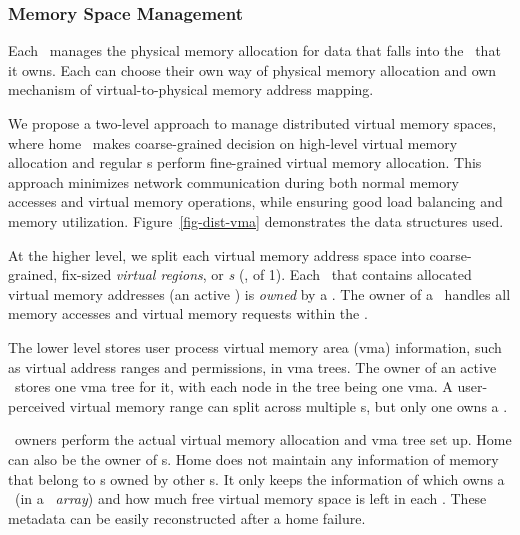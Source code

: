 \documentclass[10pt,times,twocolumn]{z2-article}
\begin{document}
{{{{{{{\subsubsection{Memory Space Management}
Each \mcomponent\ manages the physical memory allocation for data that falls into the
\vregion\ that it owns.
Each \mcomponent{} can choose their own way of physical memory allocation
and own mechanism of virtual-to-physical memory address mapping.

We propose a two-level approach to manage distributed virtual memory spaces,
where home \mcomponent\ makes coarse-grained decision on high-level virtual memory allocation
and regular \mcomponent{}s perform fine-grained virtual memory allocation.
This approach minimizes network communication during both normal memory accesses and virtual memory operations,
while ensuring good load balancing and memory utilization.
Figure~\ref{fig-dist-vma} demonstrates the data structures used. %

At the higher level, we split each virtual memory address space into coarse-grained, fix-sized {\em virtual regions},
or {\em \vregion{}s} (\eg, of 1\GB).
Each \vregion\ that contains allocated virtual memory addresses (an active \vregion) is {\em owned} by a \mcomponent{}.
The owner of a \vregion\ handles all memory accesses and virtual memory requests within the \vregion.

The lower level stores user process virtual memory area (vma) information,
such as virtual address ranges and permissions, in vma trees.
The owner of an active \vregion\ stores one vma tree for it,
with each node in the tree being one vma.
A user-perceived virtual memory range can split across multiple \mcomponent{}s,
but only one \mcomponent{} owns a \vregion.

\vregion\ owners perform the actual virtual memory allocation and vma tree set up.
Home \mcomponent{} can also be the owner of \vregion{}s.
Home \mcomponent{} does not maintain any information of memory that belong to \vregion{}s owned by other \mcomponent{}s.
It only keeps the information of which \mcomponent{} owns a \vregion\ (in a {\em \vregion\ array})
and how much free virtual memory space is left in each \vregion.
These metadata can be easily reconstructed after a home \mcomponent{} failure.

}}}}}}}
\end{document}
